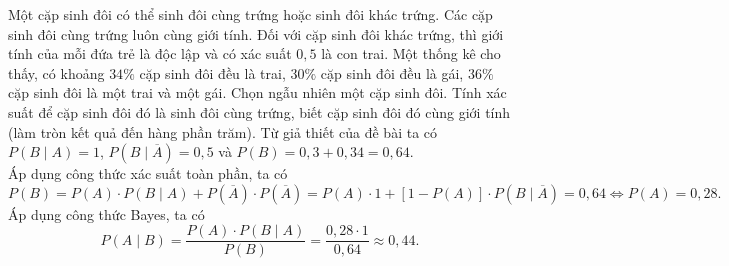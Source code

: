 
\begin{bt}%
	Một cặp sinh đôi có thể sinh đôi cùng trứng hoặc sinh đôi khác trứng. Các cặp sinh đôi cùng trứng luôn cùng giới tính. Đối với cặp sinh đôi khác trứng, thì giới tính của mỗi đứa trẻ là độc lập và có xác suất $0{,}5$ là con trai. Một thống kê cho thấy, có khoảng $34\%$ cặp sinh đôi đều là trai, $30\%$ cặp sinh đôi đều là gái, $36\%$ cặp sinh đôi là một trai và một gái. Chọn ngẫu nhiên một cặp sinh đôi. Tính xác suất để cặp sinh đôi đó là sinh đôi cùng trứng, biết cặp sinh đôi đó cùng giới tính (làm tròn kết quả đến hàng phần trăm). 
	Từ giả thiết của đề bài ta có $P(B \mid A)=1$, $P(B \mid  \overline{A})=0{,}5$ và $P(B)=0{,}3+0{,}34=0{,}64$.\\
	Áp dụng công thức xác suất toàn phần, ta  có
	\[P(B)=P(A) \cdot P(B \mid A) +P(\overline{A}) \cdot P(\overline{A})=P(A) \cdot 1 +\left[1-P(A)\right]  \cdot P(B\mid \overline{A})=0{,}64 \Leftrightarrow P(A)=0{,}28.\]
	 Áp dụng công thức Bayes, ta có
	\[P(A \mid B) =\dfrac{P(A) \cdot P(B \mid A)}{P(B)}=\dfrac{0{,}28 \cdot 1}{0{,}64}  \approx 0{,}44.\]
\end{bt}

